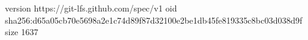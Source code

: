 version https://git-lfs.github.com/spec/v1
oid sha256:d65a05cb70e5698a2e1c74d89f87d32100e2be1db45fe819335c8bc03d038d9f
size 1637

